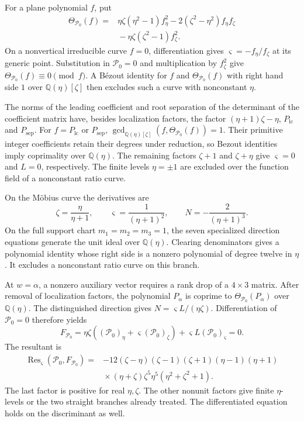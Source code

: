 \documentclass[11pt,a4paper]{article}
\numberwithin{equation}{section}
\theoremstyle{plain}
\theoremstyle{definition}
\theoremstyle{remark}
\begin{document}
For a plane polynomial $f$, put
\[
 \begin{aligned}
 \Theta_{\mathcal P_0}(f)={}&\eta\zeta(\eta^2-1)f_\eta^2
                  -2(\zeta^2-\eta^2)f_\eta f_\zeta\\
              &{}-\eta\zeta(\zeta^2-1)f_\zeta^2.
 \end{aligned}
\]
On a nonvertical irreducible curve $f=0$, differentiation gives
$\varsigma=-f_\eta/f_\zeta$ at its generic point. Substitution in
$\mathcal P_0=0$ and multiplication by $f_\zeta^2$ give
$\Theta_{\mathcal P_0}(f)\equiv0\pmod f$.
A B\'ezout identity for $f$ and $\Theta_{\mathcal P_0}(f)$ with
right hand side $1$ over $\mathbb Q(\eta)[\zeta]$ then excludes
such a curve with nonconstant $\eta$.

The norms of the leading coefficient and root separation of the determinant of the coefficient matrix have, besides localization factors, the factor
$(\eta+1)\zeta-\eta$, $P_{\mathrm{lc}}$ and $P_{\mathrm{sep}}$.
For $f=P_{\mathrm{lc}}$ or $P_{\mathrm{sep}}$,
$\gcd_{\mathbb Q(\eta)[\zeta]}(f,\Theta_{\mathcal P_0}(f))=1$.
Their primitive integer coefficients retain their degrees under
reduction, so Bezout identities imply coprimality over $\mathbb Q(\eta)$.
The remaining factors $\zeta+1$ and $\zeta+\eta$ give
$\varsigma=0$ and $L=0$, respectively.
The finite levels $\eta=\pm1$ are excluded over the function field
of a nonconstant ratio curve.

On the M\"obius curve the derivatives are
\[
 \zeta =\frac{\eta }{\eta +1},\qquad \varsigma =\frac1{(\eta +1)^2},\qquad
 N=-\frac2{(\eta +1)^3}.
\]
On the full support chart $m_1=m_2=m_3=1$, the seven specialized
direction equations generate the unit ideal over
$\mathbb Q(\eta)$. Clearing denominators gives a polynomial identity
whose right side is a nonzero polynomial of degree twelve in $\eta$.
It excludes a nonconstant ratio curve on this branch.

At $w=\alpha$, a nonzero auxiliary vector requires a rank drop of a
$4\times3$ matrix. After removal of localization factors, the polynomial
$P_\alpha$ is coprime to $\Theta_{\mathcal P_0}(P_\alpha)$ over $\mathbb Q(\eta)$.
The distinguished direction gives $N=\varsigma L/(\eta\zeta)$.
Differentiation of $\mathcal P_0=0$ therefore yields
\[
 F_{\mathcal P_0}=\eta \zeta ((\mathcal P_0)_\eta +\varsigma (\mathcal P_0)_\zeta )+\varsigma L(\mathcal P_0)_\varsigma =0.
\]
The resultant is
\[
 \begin{aligned}
 \operatorname{Res}_\varsigma (\mathcal P_0,F_{\mathcal P_0})={}&-12(\zeta -\eta )(\zeta -1)(\zeta +1)(\eta -1)(\eta +1)\\
 &{}\times(\eta +\zeta )\zeta ^5\eta ^5(\eta ^2+\zeta ^2+1).
 \end{aligned}
\]
The last factor is positive for real $\eta,\zeta$.
The other nonunit factors give finite $\eta$-levels or the two straight
branches already treated. The differentiated equation holds on the
discriminant as well.
\end{document}
